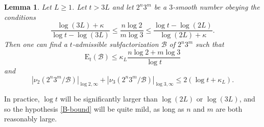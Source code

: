 \documentclass[12pt,a4paper,reqno]{amsart}
\numberwithin{equation}{section}
\theoremstyle{plain}
\newtheorem{lemma}[theorem]{Lemma}
\theoremstyle{definition}
\newcommand\tuple{{\mathcal B}}
\newcommand\excess{{\mathrm{E}}}
\begin{document}
\begin{lemma}\label{bound23}  Let $L \geq 1$.  Let $t > 3L$ and let $2^n 3^m$ be a $3$-smooth number obeying the conditions
  \begin{equation}\label{B-bound}
  \frac{\log(3L)+\kappa}{\log t - \log(3L)} \leq \frac{n \log 2}{m \log 3} \leq \frac{\log t - \log(2L)}{\log(2L)+\kappa}.
  \end{equation}
  Then one can find a $t$-admissible subfactorization $\tuple$ of $2^n 3^m$ such that
  \begin{equation}\label{excess-bound} 
    \excess_t(\tuple) \leq \kappa_L \frac{n \log 2 + m \log 3}{\log t} 
  \end{equation}
  and
  \begin{equation}\label{surplus-bound} 
    |\nu_2(2^n 3^m/\tuple)|_{\log 2,\infty} + |\nu_3(2^n 3^m/\tuple)|_{\log 3,\infty}  \leq 2(\log t + \kappa_L).
  \end{equation}
  \end{lemma}
  
  In practice, $\log t$ will be significantly larger than $\log(2L)$ or $\log(3L)$, and so the hypothesis \eqref{B-bound} will be quite mild, as long as $n$ and $m$ are both reasonably large.
  
\end{document}
